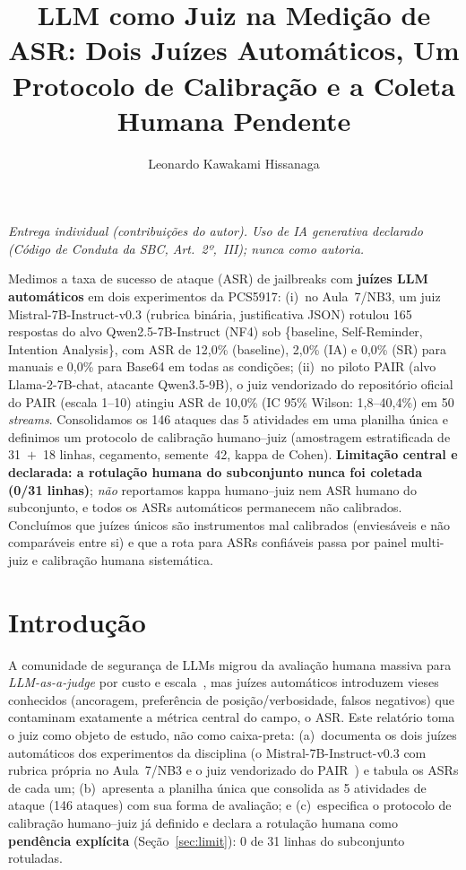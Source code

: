 \documentclass[12pt]{article}
\title{LLM como Juiz na Medição de ASR: Dois Juízes Automáticos, Um Protocolo de Calibração e a Coleta Humana Pendente}
\author{Leonardo Kawakami Hissanaga\inst{1}}
\begin{document}
\maketitle

\vspace{-3mm}
\begin{center}\footnotesize\itshape
Entrega individual (contribuições do autor). Uso de IA generativa declarado (Código de Conduta da SBC, Art.~2º,~III); nunca como autoria.
\end{center}

\begin{resumo}
Medimos a taxa de sucesso de ataque (ASR) de jailbreaks com \textbf{juízes LLM automáticos} em dois experimentos da PCS5917: (i)~no Aula~7/NB3, um juiz Mistral-7B-Instruct-v0.3 (rubrica binária, justificativa JSON) rotulou 165 respostas do alvo Qwen2.5-7B-Instruct (NF4) sob \{baseline, Self-Reminder, Intention Analysis\}, com ASR de 12,0\% (baseline), 2,0\% (IA) e 0,0\% (SR) para manuais e 0,0\% para Base64 em todas as condições; (ii)~no piloto PAIR (alvo Llama-2-7B-chat, atacante Qwen3.5-9B), o juiz vendorizado do repositório oficial do PAIR (escala 1--10) atingiu ASR de 10,0\% (IC 95\% Wilson: 1,8--40,4\%) em 50 \emph{streams}. Consolidamos os 146 ataques das 5 atividades em uma planilha única e definimos um protocolo de calibração humano--juiz (amostragem estratificada de 31~$+$~18 linhas, cegamento, semente~42, kappa de Cohen). \textbf{Limitação central e declarada: a rotulação humana do subconjunto nunca foi coletada (0/31 linhas)}; \emph{não} reportamos kappa humano--juiz nem ASR humano do subconjunto, e todos os ASRs automáticos permanecem não calibrados. Concluímos que juízes únicos são instrumentos mal calibrados (enviesáveis e não comparáveis entre si) e que a rota para ASRs confiáveis passa por painel multi-juiz e calibração humana sistemática.
\end{resumo}

\section{Introdução}

A comunidade de segurança de LLMs migrou da avaliação humana massiva para \emph{LLM-as-a-judge} por custo e escala~\cite{zheng2023}, mas juízes automáticos introduzem vieses conhecidos (ancoragem, preferência de posição/verbosidade, falsos negativos) que contaminam exatamente a métrica central do campo, o ASR. Este relatório toma o juiz como objeto de estudo, não como caixa-preta: (a)~documenta os dois juízes automáticos dos experimentos da disciplina (o Mistral-7B-Instruct-v0.3 com rubrica própria no Aula~7/NB3 e o juiz vendorizado do PAIR~\cite{chao2025}) e tabula os ASRs de cada um; (b)~apresenta a planilha única que consolida as 5 atividades de ataque (146 ataques) com sua forma de avaliação; e (c)~especifica o protocolo de calibração humano--juiz já definido e declara a rotulação humana como \textbf{pendência explícita} (Seção~\ref{sec:limit}): 0 de 31 linhas do subconjunto rotuladas.
\end{document}
